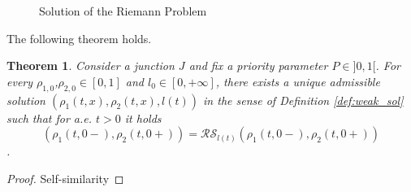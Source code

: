 \documentclass[12pt,subeqn]{article}
\numberwithin{equation}{section}
\newtheorem{theorem}{Theorem}
\newcommand{\Riem}{\mathcal{RS}}
\begin{document}
\begin{figure}[H]
\centering

\caption{Solution of the Riemann Problem}
\label{fig:RiemProb}
\end{figure}
The following theorem holds.
\begin{theorem}
	\label{th:existenceSol}
	Consider a junction $J$ and fix a priority parameter $P \in  ]0,1[$. For every $\rho_{1,0}$,$\rho_{2,0} \in [0,1]$ and $l_0 \in [0, +\infty]$, there exists a unique admissible solution $(\rho_1(t,x),\rho_2(t,x),l(t))$ in the sense of Definition \ref{def:weak_sol} such that for a.e. $t>0$ it holds
$$(\rho_1(t,0-),\rho_2(t,0+))=\Riem_{l(t)}(\rho_1(t,0-),\rho_2(t,0+))$$. 
\end{theorem}
\begin{proof}
	Self-similarity
\end{proof}
\end{document}
